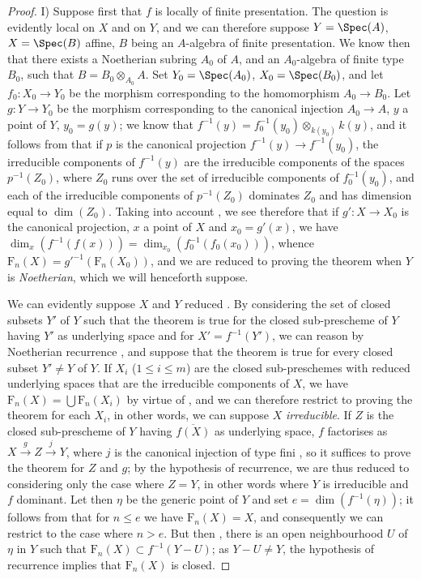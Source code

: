 \begin{proof}
I) Suppose first that $f$ is locally of finite presentation.
The question is evidently local on $X$ and on $Y$, and we can therefore suppose $Y=\Spec(A)$, $X=\Spec(B)$ affine, $B$ being an $A$-algebra of finite presentation.
We know then  that there exists a Noetherian subring $A_0$ of $A$, and an $A_0$-algebra of finite type $B_0$, such that $B=B_0\otimes_{A_0}A$.
Set $Y_0=\Spec(A_0)$, $X_0=\Spec(B_0)$, and let $f_0:X_0\to Y_0$ be the morphism corresponding to the homomorphism $A_0\to B_0$.
Let $g:Y\to Y_0$ be the morphism corresponding to the canonical injection $A_0\to A$, $y$ a point of $Y$, $y_0=g(y)$; we know that $f^{-1}(y)=f_0^{-1}(y_0)\otimes_{k(y_0)}k(y)$, and it follows from  that if $p$ is the canonical projection $f^{-1}(y)\to f^{-1}(y_0)$, the irreducible components of $f^{-1}(y)$ are the irreducible components of the spaces $p^{-1}(Z_0)$, where $Z_0$ runs over the set of irreducible components of $f_0^{-1}(y_0)$, and each of the irreducible components of $p^{-1}(Z_0)$ dominates $Z_0$ and has dimension equal to $\dim(Z_0)$.
Taking into account , we see therefore that if $g':X\to X_0$ is the canonical projection, $x$ a point of $X$ and $x_0=g'(x)$, we have $\dim_x(f^{-1}(f(x)))=\dim_{x_0}(f_0^{-1}(f_0(x_0)))$, whence $\mathrm{F}_n(X)={g'}^{-1}(\mathrm{F}_n(X_0))$, and we are reduced to proving the theorem when $Y$ is \emph{Noetherian}, which we will henceforth suppose.

We can evidently suppose $X$ and $Y$ reduced .
By considering the set of closed subsets $Y'$ of $Y$ such that the theorem is true for the closed sub-prescheme of $Y$ having $Y'$ as underlying space and for $X'=f^{-1}(Y')$, we can reason by Noetherian recurrence , and suppose that the theorem is true for every closed subset $Y'\neq Y$ of $Y$.
If $X_i$ ($1\leq i\leq m$) are the closed sub-preschemes with reduced underlying spaces that are the irreducible components of $X$, we have $\mathrm{F}_n(X)=\bigcup\mathrm{F}_n(X_i)$ by virtue of , and we can therefore restrict to proving the theorem for each $X_i$, in other words, we can suppose $X$ \emph{irreducible}.
If $Z$ is the closed sub-prescheme of $Y$ having $\overline{f(X)}$ as underlying space, $f$ factorises as $X\xrightarrow{g}Z\xrightarrow{j}Y$, where $j$ is the canonical injection of type fini , so it suffices to prove the theorem for $Z$ and $g$; by the hypothesis of recurrence, we are thus reduced to considering only the case where $Z=Y$, in other words where $Y$ is irreducible and $f$ dominant.
Let then $\eta$ be the generic point of $Y$ and set $e=\dim(f^{-1}(\eta))$; it follows from  that for $n\leq e$ we have $\mathrm{F}_n(X)=X$, and consequently we can restrict to the case where $n>e$.
But then , there is an open neighbourhood $U$ of $\eta$ in $Y$ such that $\mathrm{F}_n(X)\subset f^{-1}(Y-U)$; as $Y-U\neq Y$, the hypothesis of recurrence implies that $\mathrm{F}_n(X)$ is closed.


\end{proof}
